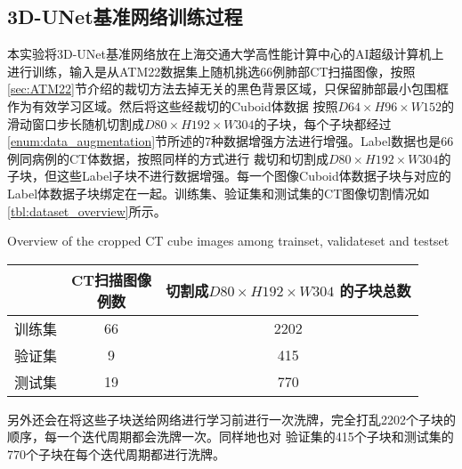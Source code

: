 \subsection{3D-UNet基准网络训练过程}\label{sec:baseline_experiment_training}
本实验将3D-UNet基准网络放在上海交通大学高性能计算中心的AI超级计算机上进行训练，输入是从ATM22数据集上随机挑选66例肺部CT扫描图像，按照
\ref{sec:ATM22}节介绍的裁切方法去掉无关的黑色背景区域，只保留肺部最小包围框作为有效学习区域。然后将这些经裁切的Cuboid体数据
按照$D64 \times H96 \times W152$的滑动窗口步长随机切割成$D80 \times H192 \times W304$的子块，每个子块都经过
\ref{enum:data_augmentation}节所述的7种数据增强方法进行增强。Label数据也是66例同病例的CT体数据，按照同样的方式进行
裁切和切割成$D80 \times H192 \times W304$的子块，但这些Label子块不进行数据增强。每一个图像Cuboid体数据子块与对应的
Label体数据子块绑定在一起。训练集、验证集和测试集的CT图像切割情况如\autoref{tbl:dataset_overview}所示。
\begin{table}[!htp]
        {Overview of the cropped CT cube images among trainset, validateset and testset}
    \label{tbl:dataset_overview}
    \centering
    \begin{tabular}{c|c|c}
        \hline
          & \makecell{CT扫描图像\\例数} & \makecell{切割成$D80 \times H192 \times W304$\\的子块总数} \\
        \hline
        训练集 & 66 & 2202 \\
        验证集 & 9  & 415 \\
        测试集 & 19 & 770 \\
        \hline
    \end{tabular}
\end{table}
另外还会在将这些子块送给网络进行学习前进行一次洗牌，完全打乱2202个子块的顺序，每一个迭代周期都会洗牌一次。同样地也对
验证集的415个子块和测试集的770个子块在每个迭代周期都进行洗牌。

